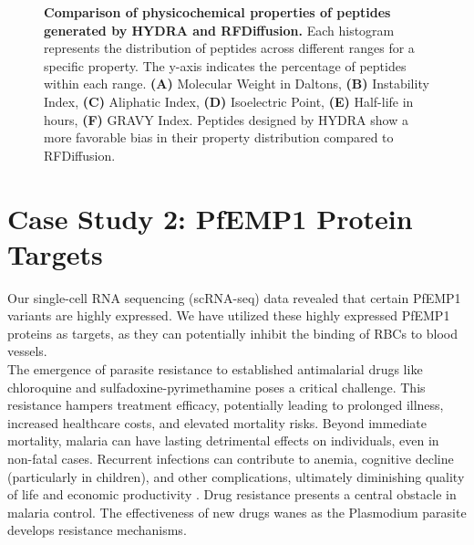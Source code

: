 \begin{figure}
  \center


  \caption{\textbf{Comparison of physicochemical properties of peptides generated by HYDRA and RFDiffusion.} Each histogram represents the distribution of peptides across different ranges for a specific property. The y-axis indicates the percentage of peptides within each range. \textbf{(A)} Molecular Weight in Daltons, \textbf{(B)} Instability Index, \textbf{(C)} Aliphatic Index, \textbf{(D)} Isoelectric Point, \textbf{(E)} Half-life in hours, \textbf{(F)} GRAVY Index. Peptides designed by HYDRA show a more favorable bias in their property distribution compared to RFDiffusion.}

  \label{fig:pc_performance}
\end{figure}

\section{Case Study 2: PfEMP1 Protein Targets}
Our single-cell RNA sequencing (scRNA-seq) data revealed that certain PfEMP1 variants are highly expressed. We have utilized these highly expressed PfEMP1 proteins as targets, as they can potentially inhibit the binding of RBCs to blood vessels. \\

The emergence of parasite resistance to established antimalarial drugs like chloroquine and sulfadoxine-pyrimethamine poses a critical challenge. This resistance hampers treatment efficacy, potentially leading to prolonged illness, increased healthcare costs, and elevated mortality risks. Beyond immediate mortality, malaria can have lasting detrimental effects on individuals, even in non-fatal cases. Recurrent infections can contribute to anemia, cognitive decline (particularly in children), and other complications, ultimately diminishing quality of life and economic productivity \cite{shukla2023supervised}. Drug resistance presents a central obstacle in malaria control. The effectiveness of new drugs wanes as the Plasmodium parasite develops resistance mechanisms. \\

